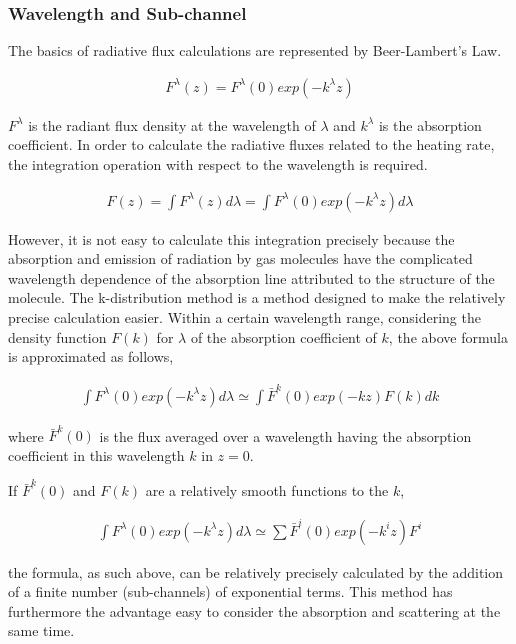 \hypertarget{wavelength-and-sub-channel}{%
\subsubsection{Wavelength and Sub-channel}\label{wavelength-and-sub-channel}}

The basics of radiative flux calculations are represented by Beer-Lambert's Law.

\begin{eqnarray}
  F^\lambda(z) = F^\lambda(0) exp (-k^\lambda z)
\end{eqnarray}

\(F^{\lambda}\) is the radiant flux density at the wavelength of \(\lambda\) and \(k^{\lambda}\) is the absorption coefficient. In order to calculate the radiative fluxes related to the heating rate,
the integration operation with respect to the wavelength is required.

\begin{eqnarray}
  F(z) = \int F^\lambda(z) d \lambda= \int F^\lambda(0) exp (-k^\lambda z) d \lambda
\end{eqnarray}

However, it is not easy to calculate this integration precisely because the absorption and emission of radiation by gas molecules have the complicated wavelength dependence of the absorption line
attributed to the structure of the molecule. The k-distribution method is a method designed to make the relatively precise calculation easier. Within a certain wavelength range, considering the
density function \(F(k)\) for \(\lambda\) of the absorption coefficient of \(k\), the above formula is approximated as follows,

\begin{eqnarray}
 \int F^\lambda(0) exp (-k^\lambda z) d \lambda
 \simeq \int \bar{F}^k(0) exp (-k z) F(k) dk
\end{eqnarray}

where \(\bar{F}^k(0)\) is the flux averaged over a wavelength having the absorption coefficient in this wavelength \(k\) in \(z=0\).

If \(\bar{F}^k(0)\) and \(F(k)\) are a relatively smooth functions to the \(k\),

\begin{eqnarray}
 \int F^\lambda(0) exp (-k^\lambda z) d \lambda
 \simeq \sum \bar{F}^i(0) exp (-k^i z) F^i
\end{eqnarray}

the formula, as such above, can be relatively precisely calculated by the addition of a finite number (sub-channels) of exponential terms. This method has furthermore the advantage easy to consider
the absorption and scattering at the same time.

